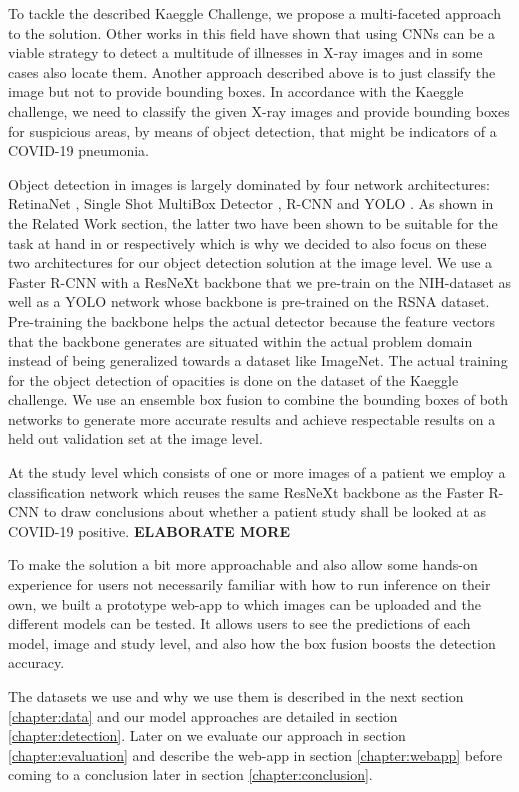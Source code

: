 To tackle the described Kaeggle Challenge, we propose a multi-faceted approach to the solution. Other works in this field have shown that using \acp{CNN} can be a viable strategy to detect a multitude of illnesses in X-ray images and in some cases also locate them. Another approach described above is to just classify the image but not to provide bounding boxes. In accordance with the Kaeggle challenge, we need to classify the given X-ray images and provide bounding boxes for suspicious areas, by means of object detection, that might be indicators of a COVID-19 pneumonia.

Object detection in images is largely dominated by four network architectures: RetinaNet \autocite{lin_focal_2018}, Single Shot MultiBox Detector \autocite{liu_ssd_2016}, \acl{R-CNN} \autocite{girshick_rich_2014} and \ac{YOLO} \autocite{yoloOriginal}. As shown in the Related Work section, the latter two have been shown to be suitable for the task at hand in \autocite{podder_efficient_2021} or \autocite{al2021fast} respectively which is why we decided to also focus on these two architectures for our object detection solution at the image level. We use a Faster \acs{R-CNN} with a ResNeXt backbone that we pre-train on the NIH-dataset as well as a \acs{YOLO} network whose backbone is pre-trained on the RSNA dataset. Pre-training the backbone helps the actual detector because the feature vectors that the backbone generates are situated within the actual problem domain instead of being generalized towards a dataset like ImageNet. The actual training for the object detection of opacities is done on the dataset of the Kaeggle challenge. We use an ensemble box fusion to combine the bounding boxes of both networks to generate more accurate results and achieve respectable results on a held out validation set at the image level.

At the study level which consists of one or more images of a patient we employ a classification network which reuses the same ResNeXt backbone as the Faster \ac{R-CNN} to draw conclusions about whether a patient study shall be looked at as COVID-19 positive. \textbf{ELABORATE MORE}

To make the solution a bit more approachable and also allow some hands-on experience for users not necessarily familiar with how to run inference on their own, we built a prototype web-app to which images can be uploaded and the different models can be tested. It allows users to see the predictions of each model, image and study level, and also how the box fusion boosts the detection accuracy. 

The datasets we use and why we use them is described in the next section \vref{chapter:data} and our model approaches are detailed in section \vref{chapter:detection}. Later on we evaluate our approach in section \vref{chapter:evaluation} and describe the web-app in section \vref{chapter:webapp} before coming to a conclusion later in section \vref{chapter:conclusion}.